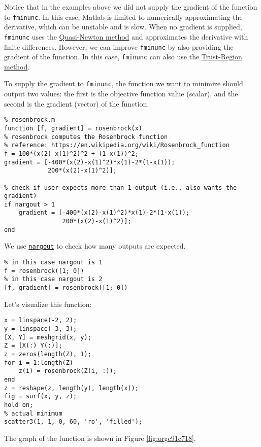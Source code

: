 \documentclass[12pt, a4paper]{article}
\begin{document}
Notice that in the examples above we did not supply the gradient of the function to \texttt{fminunc}.
In this case, Matlab is limited to numerically approximating the derivative, which can be unstable and is slow.
When no gradient is supplied, \texttt{fminunc} uses the \href{https://en.wikipedia.org/wiki/Quasi-Newton\_method}{Quasi-Newton method} and approximates the derivative with finite differences.
However, we can improve \texttt{fminunc} by also providing the gradient of the function.
In this case, \texttt{fminunc} can also use the \href{https://www.mathworks.com/help/optim/ug/unconstrained-nonlinear-optimization-algorithms.html}{Trust-Region method}.

To supply the gradient to \texttt{fminunc}, the function we want to minimize should output two values: the first is the objective function value (scalar), and the second is the gradient (vector) of the function.
\lstset{language=matlab,label= ,caption= ,captionpos=b,firstnumber=1,numbers=left,style=Matlab-editor}
\begin{lstlisting}
% rosenbrock.m
function [f, gradient] = rosenbrock(x)
% rosenbrock computes the Rosenbrock function
% reference: https://en.wikipedia.org/wiki/Rosenbrock_function
f = 100*(x(2)-x(1)^2)^2 + (1-x(1))^2;
gradient = [-400*(x(2)-x(1)^2)*x(1)-2*(1-x(1));
            200*(x(2)-x(1)^2)];

% check if user expects more than 1 output (i.e., also wants the gradient)
if nargout > 1
    gradient = [-400*(x(2)-x(1)^2)*x(1)-2*(1-x(1));
                200*(x(2)-x(1)^2)];
end
\end{lstlisting}
We use \href{https://www.mathworks.com/help/matlab/ref/nargout.html?s\_tid=doc\_ta}{\texttt{nargout}} to check how many outputs are expected.
\lstset{language=matlab,label= ,caption= ,captionpos=b,firstnumber=1,numbers=left,style=Matlab-editor}
\begin{lstlisting}
% in this case nargout is 1
f = rosenbrock([1; 0])
% in this case nargout is 2
[f, gradient] = rosenbrock([1; 0])
\end{lstlisting}

Let's visualize this function:
\lstset{language=matlab,label= ,caption= ,captionpos=b,firstnumber=1,numbers=left,style=Matlab-editor}
\begin{lstlisting}
x = linspace(-2, 2);
y = linspace(-3, 3);
[X, Y] = meshgrid(x, y);
Z = [X(:) Y(:)];
z = zeros(length(Z), 1);
for i = 1:length(Z)
    z(i) = rosenbrock(Z(i, :));
end
z = reshape(z, length(y), length(x));
fig = surf(x, y, z);
hold on;
% actual minimum
scatter3(1, 1, 0, 60, 'ro', 'filled');
\end{lstlisting}
The graph of the function is shown in Figure \ref{fig:orgc91c718}.
\end{document}
